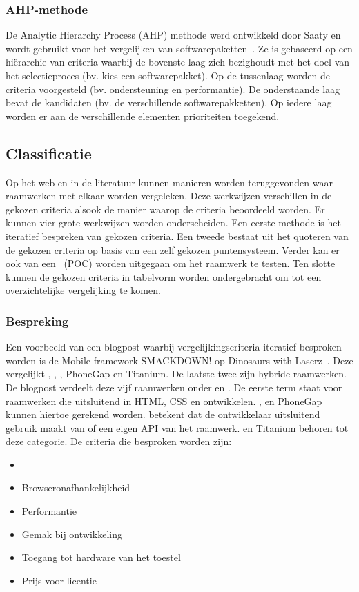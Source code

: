 \subsubsection{AHP-methode}
\label{sec:vergelijken-ahp}
De Analytic Hierarchy Process (AHP) methode werd ontwikkeld door Saaty en wordt gebruikt voor het vergelijken van softwarepaketten~\cite{Jadhav2009}.
Ze is gebaseerd op een hiërarchie van criteria waarbij de bovenste laag zich bezighoudt met het doel van het selectieproces (bv. kies een softwarepakket).
Op de tussenlaag worden de criteria voorgesteld (bv. ondersteuning en performantie).
De onderstaande laag bevat de kandidaten (bv. de verschillende softwarepakketten).
Op iedere laag worden er aan de verschillende elementen prioriteiten toegekend.

\subsection{Classificatie}
\label{sec:vergelijken-classificatie}
Op het web en in de literatuur kunnen manieren worden teruggevonden waar raamwerken met elkaar worden vergeleken.  
Deze werkwijzen verschillen in de gekozen criteria alsook de manier waarop de criteria beoordeeld worden.
Er kunnen vier grote werkwijzen worden onderscheiden.
Een eerste methode is het iteratief bespreken van gekozen criteria.
Een tweede bestaat uit het quoteren van de gekozen criteria op basis van een zelf gekozen puntensysteem.
Verder kan er ook van een ~(POC) worden uitgegaan om het raamwerk te testen.
Ten slotte kunnen de gekozen criteria in tabelvorm worden ondergebracht om tot een overzichtelijke vergelijking te komen.

\subsubsection{Bespreking}
\label{sec:manier-bespreken}
Een voorbeeld van een blogpost waarbij vergelijkingscriteria iteratief besproken worden is de Mobile framework SMACKDOWN! op Dinosaurs with Laserz~\cite{Rozynski2011}.
Deze vergelijkt \jqt{},  \jqm{},  \st{},  PhoneGap en Titanium.  
De laatste twee zijn hybride raamwerken.
De blogpost verdeelt deze vijf raamwerken onder  en .
De eerste term staat voor raamwerken die uitsluitend in HTML, CSS en \js{} ontwikkelen. 
\jqt{},  \jqm{} en PhoneGap kunnen hiertoe gerekend worden.
 betekent dat de ontwikkelaar uitsluitend gebruik maakt van \js{} of een eigen API van het raamwerk.
\st{} en Titanium behoren tot deze categorie.
De criteria die besproken worden zijn:
\begin{itemize}
 \item {}
 \item Browseronafhankelijkheid
 \item Performantie
 \item Gemak bij ontwikkeling
 \item Toegang tot hardware van het toestel
 \item Prijs voor licentie
\end{itemize}


